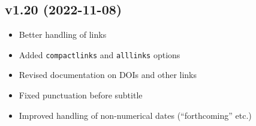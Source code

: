 \documentclass[
]{article}
\providecommand{\tightlist}{%
  \setlength{\itemsep}{0pt}\setlength{\parskip}{0pt}}
\begin{document}
\hypertarget{v1.20-2022-11-08}{%
\subsection*{v1.20 (2022-11-08)}\label{v1.20-2022-11-08}}

\begin{itemize}
\tightlist
\item
  Better handling of links
\item
  Added \texttt{compactlinks} and \texttt{alllinks} options
\item
  Revised documentation on DOIs and other links
\item
  Fixed punctuation before subtitle
\item
  Improved handling of non-numerical dates (``forthcoming'' etc.)
\end{itemize}
\end{document}
